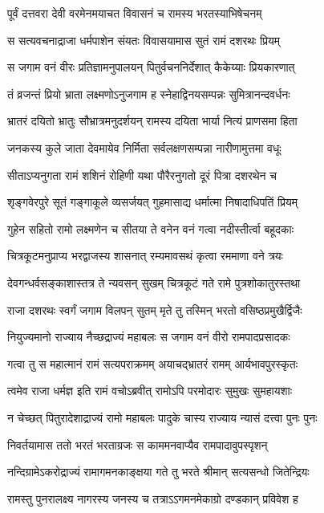 \twolineshloka
{पूर्वं दत्तवरा देवी वरमेनमयाचत}
{विवासनं च रामस्य भरतस्याभिषेचनम्}%

\twolineshloka
{स सत्यवचनाद्राजा धर्मपाशेन संयतः}
{विवासयामास सुतं रामं दशरथः प्रियम्}%

\twolineshloka
{स जगाम वनं वीरः प्रतिज्ञामनुपालयन्}
{पितुर्वचननिर्देशात् कैकेय्याः प्रियकारणात्}%

\twolineshloka
{तं व्रजन्तं प्रियो भ्राता लक्ष्मणोऽनुजगाम ह}
{स्नेहाद्विनयसम्पन्नः सुमित्रानन्दवर्धनः}%

\twolineshloka
{भ्रातरं दयितो भ्रातुः सौभ्रात्रमनुदर्शयन्}
{रामस्य दयिता भार्या नित्यं प्राणसमा हिता}%

\twolineshloka
{जनकस्य कुले जाता देवमायेव निर्मिता}
{सर्वलक्षणसम्पन्ना नारीणामुत्तमा वधूः}%

\twolineshloka
{सीताऽप्यनुगता रामं शशिनं रोहिणी यथा}
{पौरैरनुगतो दूरं पित्रा दशरथेन च}%

\twolineshloka
{शृङ्गवेरपुरे सूतं गङ्गाकूले व्यसर्जयत्}
{गुहमासाद्य धर्मात्मा निषादाधिपतिं प्रियम्}%

\twolineshloka
{गुहेन सहितो रामो लक्ष्मणेन च सीतया}
{ते वनेन वनं गत्वा नदीस्तीर्त्वा बहूदकाः}%

\twolineshloka
{चित्रकूटमनुप्राप्य भरद्वाजस्य शासनात्}
{रम्यमावसथं कृत्वा रममाणा वने त्रयः}%

\twolineshloka
{देवगन्धर्वसङ्काशास्तत्र ते न्यवसन् सुखम्}
{चित्रकूटं गते रामे पुत्रशोकातुरस्तथा}%

\twolineshloka
{राजा दशरथः स्वर्गं जगाम विलपन् सुतम्}
{मृते तु तस्मिन् भरतो वसिष्ठप्रमुखैर्द्विजैः}%

\twolineshloka
{नियुज्यमानो राज्याय नैच्छद्राज्यं महाबलः}
{स जगाम वनं वीरो रामपादप्रसादकः}%

\twolineshloka
{गत्वा तु स महात्मानं रामं सत्यपराक्रमम्}
{अयाचद्भ्रातरं रामम् आर्यभावपुरस्कृतः}%

\twolineshloka
{त्वमेव राजा धर्मज्ञ इति रामं वचोऽब्रवीत्}
{रामोऽपि परमोदारः सुमुखः सुमहायशाः}%

\twolineshloka
{न चेच्छत् पितुरादेशाद्राज्यं रामो महाबलः}
{पादुके चास्य राज्याय न्यासं दत्त्वा पुनः पुनः}%

\twolineshloka
{निवर्तयामास ततो भरतं भरताग्रजः}
{स काममनवाप्यैव रामपादावुपस्पृशन्}%

\twolineshloka
{नन्दिग्रामेऽकरोद्राज्यं रामागमनकाङ्क्षया}
{गते तु भरते श्रीमान् सत्यसन्धो जितेन्द्रियः}%

\twolineshloka
{रामस्तु पुनरालक्ष्य नागरस्य जनस्य च}
{तत्राऽऽगमनमेकाग्रो दण्डकान् प्रविवेश ह}%

